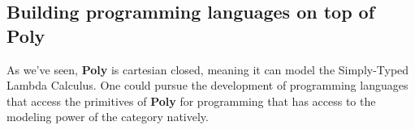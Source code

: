\subsection{Building programming languages on top of Poly}
As we've seen, \textbf{Poly} is cartesian closed, meaning it can model the Simply-Typed Lambda Calculus. One could pursue the development of programming languages that access the primitives of \textbf{Poly} for programming that has access to the modeling power of the category natively. 


